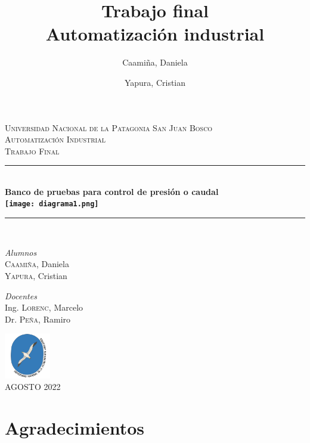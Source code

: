 \documentclass[12pt,a4paper]{article}
\date{}
\author{Caamiña, Daniela \and Yapura, Cristian}
\title{Trabajo final \\Automatización industrial}
\begin{document}
\begin{titlepage} %
	\newcommand{\HRule}{\rule{\linewidth}{0.5mm}}
	\center %
	\textsc{\LARGE Universidad Nacional de la Patagonia San Juan Bosco}\\[1.5cm]
	\textsc{\Large Automatización Industrial}\\[0.5cm]
	\textsc{\large Trabajo Final}\\[0.5cm]
	\HRule\\%
	\huge\bfseries{Banco de pruebas para control de presión o caudal}\\[0.2cm]
		\texttt{[image: diagrama1.png]}
	\HRule\\%
	\vspace{0.5cm}
	
	\begin{minipage}{0.4\textwidth}
		\begin{flushleft}
			\large
			\textit{Alumnos}\\
			\textsc{Caamiña,} Daniela \\
			\textsc{Yapura,} Cristian
		\end{flushleft}
	\end{minipage}
	\begin{minipage}{0.4\textwidth}
		\begin{flushright}
			\large
			\textit{Docentes}\\
			Ing. \textsc{Lorenc,} Marcelo \\
			Dr. \textsc{Peña,} Ramiro
		\end{flushright}
	\end{minipage}

\vspace{1cm}
	\includegraphics[width=0.15\textwidth]{unpsjb.png}\\[0.4cm]
	\large{AGOSTO 2022}
\end{titlepage}

\newpage
	


\section*{Agradecimientos}
\vspace{6cm}
\end{document}
